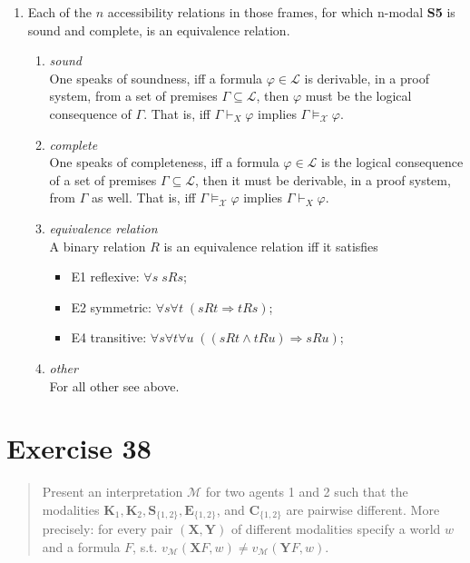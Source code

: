 \documentclass[11pt,a4paper]{article}
\newcommand{\eall}{\mathbf{K}}
\newcommand{\edisp}{\mathbf{S}}
\newcommand{\egen}{\mathbf{E}}
\newcommand{\ecom}{\mathbf{C}}
\newcommand{\sto}{\Rightarrow}
\begin{document}
\begin{enumerate}
\item 
Each of the $n$ accessibility relations in those frames, for which n-modal \textbf{S5} is sound and complete, is an equivalence relation.

\begin{enumerate}
\item \textit{sound}  \\
One speaks of soundness, iff a formula $\varphi \in \mathcal{L}$ is derivable, in a proof system, from a set of premises $\Gamma \subseteq \mathcal{L}$, then $\varphi$ must be the logical consequence of $\Gamma$. That is, iff   $\Gamma \vdash_X \varphi$ implies $\Gamma \vDash_{\mathcal{X}} \varphi$.

\item \textit{complete} \\
One speaks of completeness, iff a formula $\varphi \in \mathcal{L}$ is the logical consequence of a set of premises $\Gamma \subseteq \mathcal{L}$, then it must be derivable, in a proof system, from $\Gamma$ as well. That is, iff  $\Gamma \vDash_{\mathcal{X}} \varphi$ implies $ \Gamma \vdash_X \varphi$.
\item \textit{equivalence relation} \\
A binary relation $R$ is an equivalence relation iff it satisfies 
\begin{itemize}
\item E1 reflexive: $\forall s \; sRs$;
\item E2 symmetric: $\forall s \forall t \;(sRt \sto tRs )$;
\item E4 transitive: $\forall s \forall t \forall u \; ((sRt \land tRu) \sto sRu)$;
\end{itemize}
\item \textit{other} \\
For all other see above.
\end{enumerate}
\end{enumerate}



\section*{Exercise 38}
\begin{quote}
Present an interpretation $\mathcal{M}$ for two agents 1 and 2 such that the modalities $\eall_1 ,\eall_2, \edisp_{\{1,2\}}, \egen_{\{1,2\}}$, and $\ecom_{\{1,2\}}$ are pairwise different. More precisely: for every pair $(\mathbf{X}, \mathbf{Y})$ of different modalities specify a world $w$ and a formula $F$, s.t. $v_{\mathcal{M}}(\mathbf{X}F,w)  \neq v_{\mathcal{M}}(\mathbf{Y}F,w)$.
\end{quote}
\end{document}
